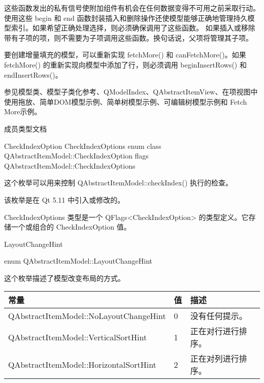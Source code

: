 这些函数发出的私有信号使附加组件有机会在任何数据变得不可用之前采取行动。使用这些 begin 和 end 函数封装插入和删除操作还使模型能够正确地管理持久模型索引。如果希望正确处理选择，则必须确保调用了这些函数。 如果插入或移除带有子项的项，则不需要为子项调用这些函数。换句话说，父项将管理其子项。

要创建增量填充的模型，可以重新实现 fetchMore() 和 canFetchMore()。如果 fetchMore() 的重新实现向模型中添加了行，则必须调用 beginInsertRows() 和 endInsertRows()。

参见模型类、模型子类化参考、QModelIndex、QAbstractItemView、在项视图中
使用拖放、简单DOM模型示例、简单树模型示例、可编辑树模型示例和 Fetch
More示例。

\splitLine

成员类型文档

CheckIndexOption CheckIndexOptions
enum class QAbstractItemModel::CheckIndexOption flags QAbstractItemModel::CheckIndexOptions

这个枚举可以用来控制 QAbstractItemModel::checkIndex() 执行的检查。


该枚举是在 Qt 5.11 中引入或修改的。

CheckIndexOptions 类型是一个 QFlags<CheckIndexOption> 的类型定义。它存储一个或组合的 CheckIndexOption 值。

\splitLine

LayoutChangeHint

enum QAbstractItemModel::LayoutChangeHint

这个枚举描述了模型改变布局的方式。

\begin{tabular}{|l|l|l|}
\hline
常量 &值&描述\\
\hline
QAbstractItemModel::NoLayoutChangeHint&	0&	没有任何提示。\\
\hline
QAbstractItemModel::VerticalSortHint&	1&	正在对行进行排序。\\
\hline
QAbstractItemModel::HorizontalSortHint&	2&	正在对列进行排序。\\
\hline
\end{tabular}


